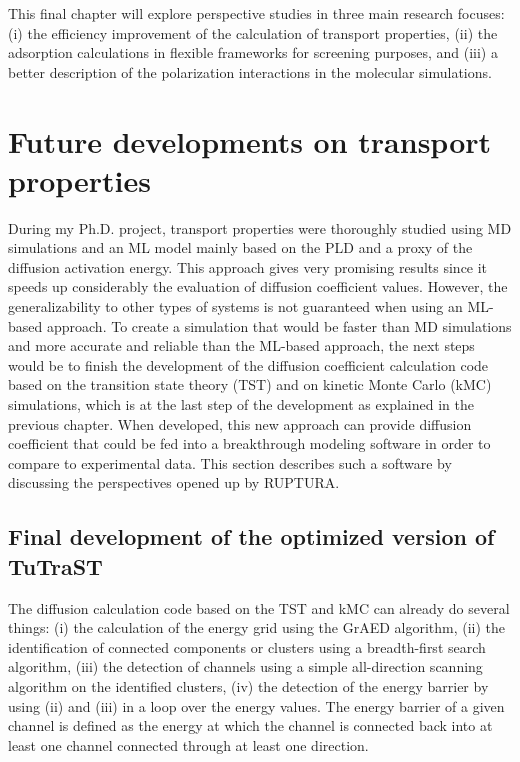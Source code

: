 \documentclass[main]{subfiles}
\begin{document}
This final chapter will explore perspective studies in three main research focuses: (i) the efficiency improvement of the calculation of transport properties, (ii) the adsorption calculations in flexible frameworks for screening purposes, and (iii) a better description of the polarization interactions in the molecular simulations.

\section{Future developments on transport properties}

During my Ph.D. project, transport properties were thoroughly studied using MD simulations and an ML model mainly based on the PLD and a proxy of the diffusion activation energy. This approach gives very promising results since it speeds up considerably the evaluation of diffusion coefficient values. However, the generalizability to other types of systems is not guaranteed when using an ML-based approach. To create a simulation that would be faster than MD simulations and more accurate and reliable than the ML-based approach, the next steps would be to finish the development of the diffusion coefficient calculation code based on the transition state theory (TST) and on kinetic Monte Carlo (kMC) simulations, which is at the last step of the development as explained in the previous chapter. When developed, this new approach can provide diffusion coefficient that could be fed into a breakthrough modeling software in order to compare to experimental data. This section describes such a software by discussing the perspectives opened up by RUPTURA\autocite{Sharma_2023}.

\subsection{Final development of the optimized version of TuTraST}

The diffusion calculation code based on the TST and kMC can already do several things: (i) the calculation of the energy grid using the GrAED algorithm, (ii) the identification of connected components or clusters using a breadth-first search algorithm, (iii) the detection of channels using a simple all-direction scanning algorithm on the identified clusters, (iv) the detection of the energy barrier by using (ii) and (iii) in a loop over the energy values. The energy barrier of a given channel is defined as the energy at which the channel is connected back into at least one channel connected through at least one direction. 
\end{document}
